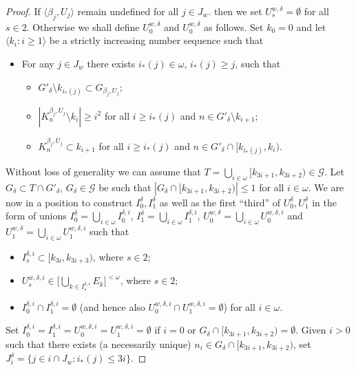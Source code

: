 \documentclass[12pt,a4paper]{amsart}
\theoremstyle{definition}
\newcommand{\w}{\omega}
\newcommand{\CG}{\mathcal{G}}
\newcommand{\la}{\langle}
\newcommand{\ra}{\rangle}
\begin{document}
\begin{proof}
{If 
      $\la\beta_j,U_j\ra$ remain undefined for all $j\in J_w$. then we set 
      $U^{w,\delta}_s=\emptyset$ for all $s\in 2$. Otherwise we 
      shall define $U^{w,\delta}_0$ and $U^{w,\delta}_0$ as follows.}
Set $k_0=0$ and let $\la k_i:i\geq 1\ra$ be a strictly increasing number sequence  such that
\begin{itemize}
\item[$(6)$]
For any $j\in {J}_w$  there exists $i_*(j)\in\w$, $i_*(j)\geq j$, such that
      \begin{itemize}
     \item[$(a)$] $G'_{\delta}\setminus k_{i_*(j)}\subset G_{\beta_j,U_j}$;
     \item[$(b)$] $|K^{\beta_j,U_j}_n\setminus k_i|\geq i^2$ for all 
     $i\geq i_*(j)$ and  $n\in G'_{\delta}\setminus k_{i+1}$;
     \item[$(c)$] $K^{\beta_j,U_j}_n\subset k_{i+1}$ for all $i\geq i_*(j)$ and $n\in
     G'_{\delta}\cap [k_{i_*(j)},k_i)$.
     \end{itemize}
\end{itemize}
Without loss of generality we can assume that 
$T=\bigcup_{i\in\w}[k_{3i+1}, k_{3i+2})\in\CG$. Let $G_\delta\subset T\cap G'_\delta$,
$G_\delta\in\CG$ be such that $|G_\delta\cap[k_{3i+1},k_{3i+2})|\leq 1$ for all $i\in\w$.
We are now in a position to
construct $I^\delta_0,I^\delta_1$ as well as 
the first ``third'' of 
$U^\delta_0,U^\delta_1$
in the form of unions 
$I^{\delta}_0=\bigcup_{i\in\w}I^{\delta,i}_0$,
$I^{\delta}_1=\bigcup_{i\in\w}I^{\delta,i}_1$,
$U^{w,\delta}_0=\bigcup_{i\in\w}U^{w,\delta,i}_0$ and
$U^{w,\delta}_1=\bigcup_{i\in\w}U^{w,\delta,i}_1$ such that
\begin{itemize}
\item[$(7)$] $I^{\delta,i}_s\subset [k_{3i},k_{3i+3} ) $,
where $s\in 2$;
\item[$(8)$] $U^{w,\delta,i}_s\in \big[\bigcup_{k\in I^{\delta,i}_s  }E_k \big]^{<\w}$,
where $s\in 2$;
\item[$(9)$]  $I^{\delta,i}_0\cap I^{\delta,i}_1=\emptyset$ 
(and hence also $U^{w,\delta,i}_0\cap U^{w,\delta,i}_1=\emptyset$)
for all $i\in\w$.
\end{itemize}
\addtocounter{equation}{9}
Set $I^{\delta,i}_0= I^{\delta,i}_1 =U^{w,\delta,i}_0= U^{w,\delta,i}_1=\emptyset$
if $i=0$ or $G_\delta\cap [k_{3i+1},k_{3i+2})=\emptyset$.
Given $i>0$ such that there exists (a necessarily unique)
$n_i\in G_\delta\cap[k_{3i+1},k_{3i+2})$, set $J^\delta_i=\{j\in i\cap J_w: i_*(j)\leq 3i\}$. 

\end{proof}
\end{document}
